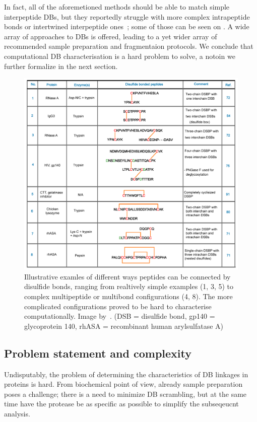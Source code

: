 In fact, all of the aforemetioned methods should be able to match simple interpeptide DBs, but they reportedly struggle with more complex intrapeptide bonds or intertwined interpeptide ones~\cite{lakbub2018recent}; some of those can be seen on . A wide array of approaches to DBs is offered, leading to a yet wider array of recommended sample preparation and fragmentaion protocols. We conclude that computational DB characterisation is a hard problem to solve, a notoin we further formalize in the next section.

\begin{figure}
  \centering
  \includegraphics[width=1\linewidth]{img/bond-types.png}
  \caption{Illustrative examles of different ways peptides can be connected by disulfide bonds, ranging from realtively simple examples (1, 3, 5) to complex multipeptide or multibond configurations (4, 8). The more complicated configurations proved to be hard to characterise computationally. Image by~\citet{lakbub2018recent}. (DSB = disulfide bond, gp140 = glycoprotein 140, rhASA = recombinant human arylsulfatase A)}\label{fig:bond-types}
\end{figure}


\subsection{Problem statement and complexity}

Undisputably, the problem of determining the characteristics of DB linkages in proteins is hard. From biochemical point of view, already sample preparation poses a challenge; there is a need to minimize DB scrambling, but at the same time have the protease be as specific as possible to simplify the subseqeucnt analysis.

